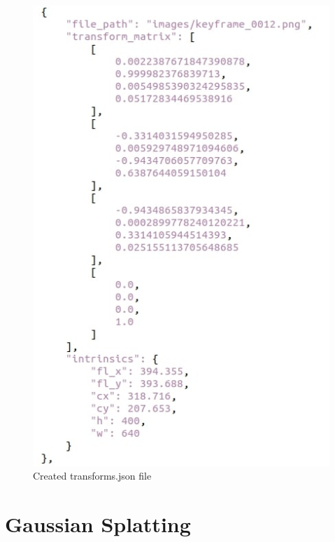 \begin{figure}[htbp]
	\centering
	\includegraphics[width=150mm, keepaspectratio]{figures_jpg/transforms_json.jpg}
	\caption{Created transforms.json file}
	\label{fig:transforms_json}
\end{figure}

\FloatBarrier
\section{Gaussian Splatting}


